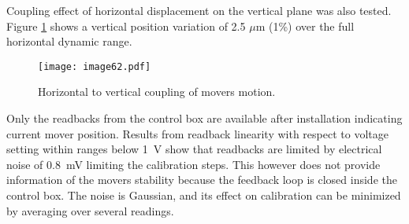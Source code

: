 Coupling effect of horizontal displacement on the vertical plane was also tested. Figure \ref{f:Cedratcoupling} shows a vertical position variation of 2.5 $\mu$m (1\%) over the full horizontal dynamic range.\par
\begin{figure}[!htb]
\centering
\texttt{[image: image62.pdf]}\caption{Horizontal to vertical coupling of movers motion.}\label{f:Cedratcoupling}
\end{figure}
Only the readbacks from the control box are available after installation indicating current mover position. Results from readback linearity with respect to voltage setting within ranges below 1~V show that readbacks are limited by electrical noise of $0.8$~mV limiting the calibration steps. This however does not provide information of the movers stability because the feedback loop is closed inside the control box. The noise is Gaussian, and its effect on calibration can be minimized by averaging over several readings.\par

